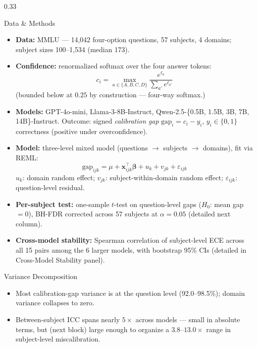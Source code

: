 \documentclass[final]{beamer}
\begin{document}
\begin{frame}[t]
\begin{columns}[t]
\begin{column}{0.33\linewidth}
    \begin{block}{Data \& Methods}
      \begin{itemize}
        \item \textbf{Data:} MMLU --- 14{,}042 four-option questions, 57
          subjects, 4 domains; subject sizes 100--1{,}534 (median 173).
        \vspace{0.3em}
        \item \textbf{Confidence:} renormalized softmax over the four
          answer tokens:
\[
  c_i = \max_{a \in \{A,B,C,D\}} \frac{e^{\ell_a}}{\sum_{a'} e^{\ell_{a'}}}
\]
          {\small (bounded below at $0.25$ by construction --- four-way
          softmax.)}
        \item \textbf{Models:} GPT-4o-mini, Llama-3-8B-Instruct,
          Qwen-2.5-\{0.5B, 1.5B, 3B, 7B, 14B\}-Instruct. Outcome: signed
          \emph{calibration gap} $\mathrm{gap}_i = c_i - y_i$, $y_i \in
          \{0,1\}$ correctness (positive under overconfidence).
        \vspace{0.3em}
        \item \textbf{Model:} three-level mixed model (questions $\to$
          subjects $\to$ domains), fit via REML:
\[
  \mathrm{gap}_{ijk} = \mu + \mathbf{x}_{ijk}^\top\boldsymbol{\beta}
    + u_k + v_{jk} + \varepsilon_{ijk}
\]
          {\small $u_k$: domain random effect; $v_{jk}$: subject-within-domain
          random effect; $\varepsilon_{ijk}$: question-level residual.}
        \item \textbf{Per-subject test:} one-sample $t$-test on question-level
          gaps ($H_0$: mean gap $=0$), BH-FDR corrected across 57 subjects at
          $\alpha=0.05$ (detailed next column).
        \item \textbf{Cross-model stability:} Spearman correlation of
          subject-level ECE across all 15 pairs among the 6 larger models,
          with bootstrap 95\% CIs (detailed in Cross-Model Stability panel).
      \end{itemize}
    \end{block}

    \begin{block}{Variance Decomposition}
      \begin{itemize}
        \item Most calibration-gap variance is at the question level
          (92.0--98.5\%); domain variance collapses to zero.
        \item Between-subject ICC spans nearly $5\times$ across models ---
          small in absolute terms, but (next block) large enough to organize
          a $3.8$--$13.0\times$ range in subject-level miscalibration.
      \end{itemize}


\end{block}
\end{column}
\end{columns}
\end{frame}
\end{document}
